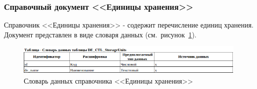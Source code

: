 % 
% 
% 
% 
% 




\subsubsection{Справочный документ <<Единицы хранения>>}

Справочник <<Единицы хранения>> - содержит перечисление единиц хранения.
Документ представлен в виде словаря данных (см.~рисунок~\ref{fig:InformationalModel_DE_CTL_StorageUnits}).

\begin{figure}[!h]
    \centering
    \includegraphics[width=16cm]
    {assets/InformationalModel/DE_CTL_StorageUnits.png}
    \caption{Словарь данных справочника <<Единицы хранения>>}
    \label{fig:InformationalModel_DE_CTL_StorageUnits}
\end{figure}

